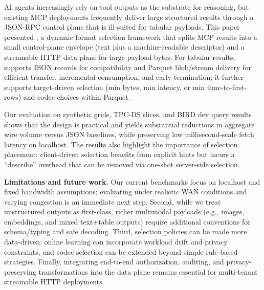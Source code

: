 \label{sec:conclude}
AI agents increasingly rely on tool outputs as the substrate for reasoning, but existing MCP deployments frequently deliver large structured results through a JSON-RPC control plane that is ill-suited for tabular payloads. This paper presented \system, a dynamic format selection framework that splits MCP results into a small control-plane envelope (text plus a machine-readable descriptor) and a streamable HTTP data plane for large payload bytes. For tabular results, \system supports JSON records for compatibility and Parquet blob/stream delivery for efficient transfer, incremental consumption, and early termination; it further supports target-driven selection (min bytes, min latency, or min time-to-first-rows) and codec choices within Parquet.

Our evaluation on synthetic grids, TPC-DS slices, and BIRD dev query results shows that the design is practical and yields substantial reductions in aggregate wire volume versus JSON baselines, while preserving low millisecond-scale fetch latency on localhost. The results also highlight the importance of selection placement: client-driven selection benefits from explicit hints but incurs a ``describe'' overhead that can be removed via one-shot server-side selection.

\smallskip
\noindent\textbf{Limitations and future work.}
Our current benchmarks focus on localhost and fixed bandwidth assumptions; evaluating under realistic WAN conditions and varying congestion is an immediate next step. Second, while we treat unstructured outputs as first-class, richer multimodal payloads (e.g., images, embeddings, and mixed text+table outputs) require additional conventions for schema/typing and safe decoding. Third, selection policies can be made more data-driven: online learning can incorporate workload drift and privacy constraints, and codec selection can be extended beyond simple rule-based strategies. Finally, integrating end-to-end authorization, auditing, and privacy-preserving transformations into the data plane remains essential for multi-tenant streamable HTTP deployments.
